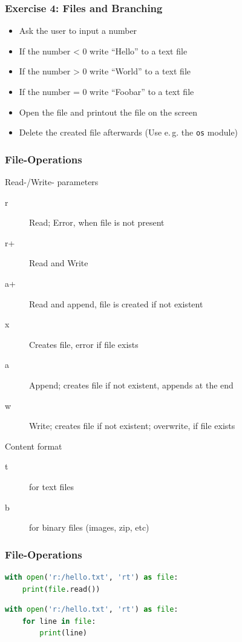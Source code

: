 \documentclass[english]{beamer}
\begin{document}
\begin{frame}
\frametitle{Exercise 4: Files and Branching}


\begin{itemize}
\item Ask the user to input a number
\item If the number < 0 write \enquote{Hello} to a text file
\item If the number > 0 write \enquote{World} to a text file
\item If the number = 0 write \enquote{Foobar} to a text file
\item Open the file and printout the file on the screen
\item Delete the created file afterwards (Use e.\,g. the \texttt{os} module)
\end{itemize}
\end{frame}

\begin{frame}[containsverbatim]
\frametitle{File-Operations}

Read-/Write- parameters

\begin{description}
\item [r] Read; Error, when file is not present
\item [r+] Read and Write
\item [a+] Read and append, file is created if not existent
\item [x] Creates file, error if file exists
\item [a] Append; creates file if not existent, appends at the end
\item [w] Write; creates file if not existent; overwrite, if file exists
\end{description}

Content format

\begin{description}
\item[t] for text files
\item[b] for binary files (images, zip, etc)
\end{description}

\end{frame}

\begin{frame}[containsverbatim]
\frametitle{File-Operations}

\begin{lstlisting}[language=Python,caption={Read a complete file}]
with open('r:/hello.txt', 'rt') as file:  
    print(file.read())
\end{lstlisting}

\begin{lstlisting}[language=Python,caption={Row-wise reading a file}]
with open('r:/hello.txt', 'rt') as file:  
    for line in file:
        print(line)
\end{lstlisting}

\end{frame}
\end{document}
